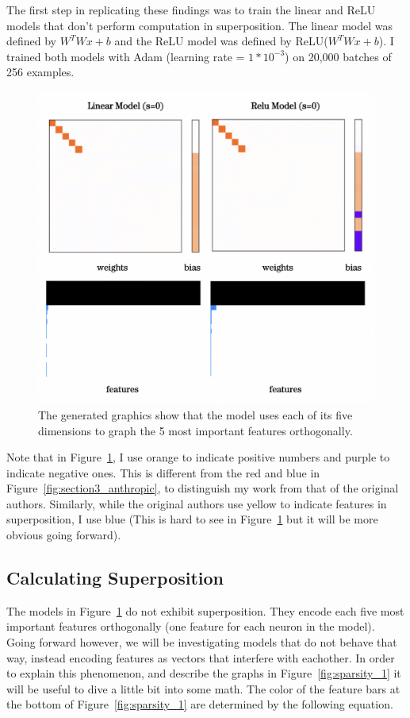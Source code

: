 \documentclass{article} %
\begin{document}
The first step in replicating these findings was to train the linear and ReLU
models that don't perform computation in superposition. The linear model was
defined by $W^TWx + b$ and the ReLU model was defined by ReLU($W^TWx + b$). I trained both models
with Adam (learning rate = $1*10^{-3}$) on 20,000 batches of 256 examples.

\begin{figure}[h]
    \centering
    \includegraphics[width=0.5\linewidth]{demonstrating_superposition/images/relu_linear_0_sparsity.png}
    \captionsetup{font=footnotesize, width=0.7\linewidth} %
    \caption{The generated graphics show that the model uses each of its five 
    dimensions to graph the 5 most important features orthogonally.}
    \label{fig:relu_linear_0}
\end{figure}

Note that in Figure~\ref{fig:relu_linear_0}, I use orange to indicate
positive numbers and purple to indicate negative ones. This is different from
the red and blue in Figure~\ref{fig:section3_anthropic}, to distinguish my work 
from that of the original authors. Similarly, while the original authors use 
yellow to indicate features in superposition, I use blue (This is hard to see in 
Figure~\ref{fig:relu_linear_0} but it will be more obvious going forward).

\subsection{Calculating Superposition}
\label{sec:calc_super}

The models in Figure~\ref{fig:relu_linear_0} do not exhibit superposition. They
encode each five most important features orthogonally (one feature for each
neuron in the model). Going forward however, we will be investigating models
that do not behave that way, instead encoding features as vectors that interfere
with eachother. In order to explain this phenomenon, and describe the graphs in 
Figure~\ref{fig:sparsity_1} it will be useful to dive a little bit into some
math. The color of the feature bars at the bottom of Figure~\ref{fig:sparsity_1}
are determined by the following equation.
\end{document}
